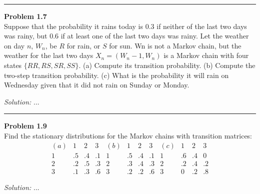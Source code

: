 \documentclass[a4paper, 11pt]{article}
\newenvironment{problem}[2][Problem]
    { \begin{mdframed}[backgroundcolor=gray!20] \textbf{#1 #2} \\}
    {  \end{mdframed}}
\newenvironment{solution}
    {\textit{Solution:}}
    {}
\begin{document}
\noindent\rule{7in}{2.8pt}
\begin{problem}{1.7}
Suppose that the probability it rains today is 0.3 if neither of the last two
days was rainy, but 0.6 if at least one of the last two days was rainy. Let the
weather on day $n$, $W_n$, be $R$ for rain, or $S$ for sun. Wn is not a Markov chain,
but the weather for the last two days $X_n = (W_n-1,W_n)$ is a Markov chain
with four states $\{RR,RS, SR, SS\}$. (a) Compute its transition probability. (b)
Compute the two-step transition probability. (c) What is the probability it will
rain on Wednesday given that it did not rain on Sunday or Monday.
\end{problem}
\begin{solution}
...
\end{solution}

\noindent\rule{7in}{2.8pt}
\begin{problem}{1.9}
	Find the stationary distributions for the Markov chains with transition matrices:
	\[\begin{array}{cccccccccccc}
	(a) & 1 & 2 & 3 & (b) & 1 & 2 & 3 & (c) & 1 & 2 & 3 \\
	1 & .5 & .4 & .1 & 1 & .5 & .4 & .1 & 1 & .6 & .4 & 0 \\
	2 & .2 & .5 & .3 & 2 & .3 & .4 & .3 & 2 & .2 & .4 & .2 \\
	3 & .1 & .3 & .6 & 3 & .2 & .2 & .6 & 3 & 0 & .2 & .8
	\end{array}\]
\end{problem}
\begin{solution}
	...
\end{solution}
\end{document}
